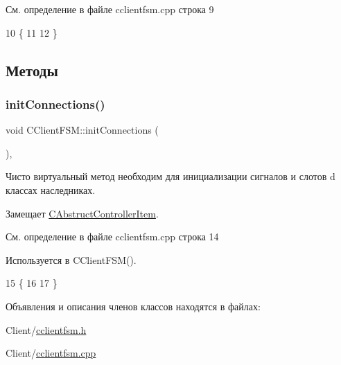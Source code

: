 См. определение в файле cclientfsm.\+cpp строка 9


\begin{DoxyCode}
10 \{
11 
12 \}
\end{DoxyCode}


\subsection{Методы}
\hypertarget{class_c_client_f_s_m_aaf6b857e9a5d2b2f55b71212e74fd4cb}{}\label{class_c_client_f_s_m_aaf6b857e9a5d2b2f55b71212e74fd4cb} 
\subsubsection{\texorpdfstring{init\+Connections()}{initConnections()}}
{\footnotesize\ttfamily void C\+Client\+F\+S\+M\+::init\+Connections (\begin{DoxyParamCaption}{ }\end{DoxyParamCaption})\hspace{0.3cm}{\ttfamily [protected]}, {\ttfamily [virtual]}}



Чисто виртуальный метод необходим для инициализации сигналов и слотов d классах наследниках. 



Замещает \hyperlink{class_c_abstruct_controller_item_a27c6889230a86cb0782e6d7596b883c1}{C\+Abstruct\+Controller\+Item}.



См. определение в файле cclientfsm.\+cpp строка 14



Используется в C\+Client\+F\+S\+M().


\begin{DoxyCode}
15 \{
16 
17 \}
\end{DoxyCode}


Объявления и описания членов классов находятся в файлах\+:\begin{DoxyCompactItemize}
\item 
Client/\hyperlink{cclientfsm_8h}{cclientfsm.\+h}\item 
Client/\hyperlink{cclientfsm_8cpp}{cclientfsm.\+cpp}\end{DoxyCompactItemize}
